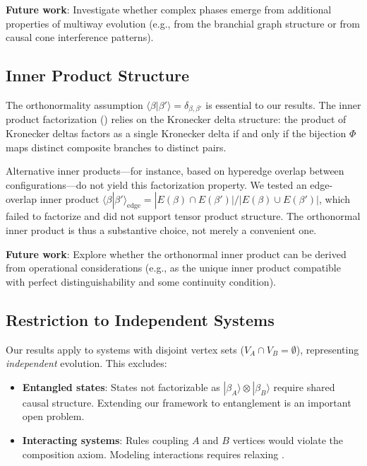\documentclass[11pt,a4paper]{article}
\theoremstyle{definition}
\theoremstyle{remark}
\newcommand{\ket}[1]{|#1\rangle}
\newcommand{\braket}[2]{\langle#1|#2\rangle}
\begin{document}
\textbf{Future work}: Investigate whether complex phases emerge from
additional properties of multiway evolution (e.g., from the branchial
graph structure or from causal cone interference patterns).

\subsection{Inner Product Structure}

The orthonormality assumption
$\braket{\beta}{\beta'} = \delta_{\beta,\beta'}$ is essential to our
results. The inner product factorization
() relies on the Kronecker delta
structure: the product of Kronecker deltas factors as a single Kronecker
delta if and only if the bijection $\Phi$ maps distinct composite
branches to distinct pairs.

Alternative inner products---for instance, based on hyperedge overlap
between configurations---do not yield this factorization property. We
tested an edge-overlap inner product
$\braket{\beta}{\beta'}_{\text{edge}} = |E(\beta) \cap E(\beta')| /
|E(\beta) \cup E(\beta')|$, which failed to factorize and did not
support tensor product structure. The orthonormal inner product is thus
a substantive choice, not merely a convenient one.

\textbf{Future work}: Explore whether the orthonormal inner product
can be derived from operational considerations (e.g., as the unique
inner product compatible with perfect distinguishability and some
continuity condition).

\subsection{Restriction to Independent Systems}

Our results apply to systems with disjoint vertex sets
($V_A \cap V_B = \emptyset$), representing \textit{independent}
evolution. This excludes:
\begin{itemize}
\item \textbf{Entangled states}: States not factorizable as
  $\ket{\beta_A} \otimes \ket{\beta_B}$ require shared causal structure.
  Extending our framework to entanglement is an important open problem.
\item \textbf{Interacting systems}: Rules coupling $A$ and $B$ vertices
  would violate the composition axiom. Modeling interactions requires
  relaxing .
\end{itemize}
\end{document}
